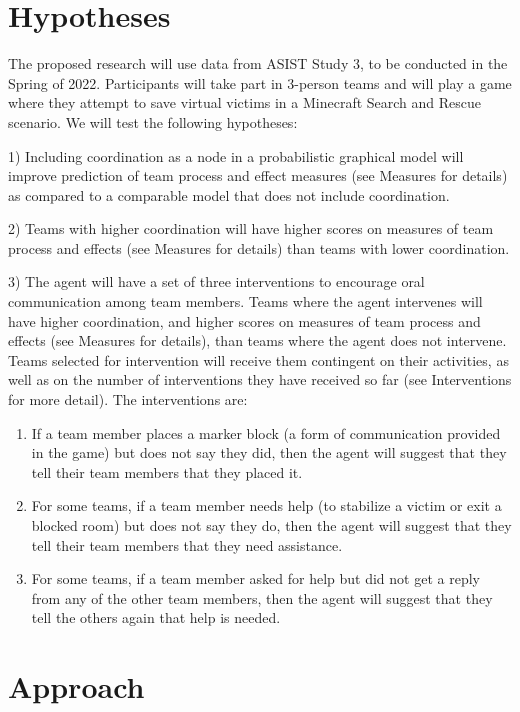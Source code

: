 
\section{Hypotheses}
The proposed research will use data from ASIST Study 3, to be conducted in the Spring of 2022. Participants will take part in 3-person teams and will play a game where they attempt to save virtual victims in a Minecraft Search and Rescue scenario. We will test the following hypotheses:

1) Including coordination as a node in a probabilistic graphical model
will improve prediction of team process and effect measures (see Measures for details)  as compared to a comparable model that does not include coordination.

2) Teams with higher coordination will have higher scores on measures of team process and effects (see Measures for details) than teams with lower coordination.

3) The agent will have a set of three interventions to encourage oral communication 
among team members. Teams where the agent intervenes will have higher
coordination, and higher scores on measures of team process and effects (see
Measures for details), than teams where the agent does not intervene. 
Teams selected for intervention will receive them contingent on their
activities, as well as on the number of interventions they have received so far
(see Interventions for more detail).  The interventions are:
\begin{enumerate}
    \item
    If a team member places a marker block (a form of communication provided in
    the game) but does not say they did, then the agent will suggest that they
    tell their team members that they placed it. 
    \item
    For some teams, if a team member needs help (to stabilize a victim or exit a
    blocked room) but does not say they do, then the agent will suggest that
    they tell their team members that they need assistance. 
    \item
    For some teams, if a team member asked for help but did not get a reply from
    any of the other team members, then the agent will suggest that they tell
    the others again that help is needed. 
\end{enumerate}

\section{Approach}


